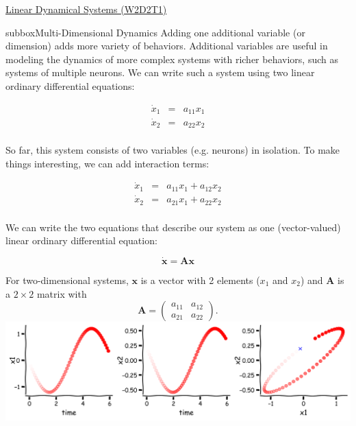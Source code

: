 \begin{textbox}{\href{https://compneuro.neuromatch.io/tutorials/W2D2_LinearSystems/student/W2D2_Tutorial1.html}{Linear Dynamical Systems (W2D2T1)} }
\begin{subbox}{subbox}{Multi-Dimensional Dynamics}
\scriptsize
Adding one additional variable (or dimension) adds more variety of behaviors. Additional variables are useful in modeling the dynamics of more complex systems with richer behaviors, such as systems of multiple neurons. We can write such a system using two linear ordinary differential equations:

\begin{eqnarray}
  \dot{x}_1 &=& {a}_{11} x_1 \\
  \dot{x}_2 &=& {a}_{22} x_2 \\
\end{eqnarray}

So far, this system consists of two variables (e.g. neurons) in isolation. To make things interesting, we can add interaction terms:

\begin{eqnarray}
  \dot{x}_1 &=& {a}_{11} x_1 + {a}_{12} x_2 \\
  \dot{x}_2 &=& {a}_{21} x_1 + {a}_{22} x_2 \\
\end{eqnarray}

We can write the two equations that describe our system as one (vector-valued) linear ordinary differential equation:

$$\dot{\mathbf{x}} = \mathbf{A} \mathbf{x}$$

For two-dimensional systems, $\mathbf{x}$ is a vector with 2 elements ($x_1$ and $x_2$) and $\mathbf{A}$ is a $2 \times 2$ matrix with 
$$\mathbf{A}=
\begin{pmatrix}
 a_{11} & a_{12} \\
 a_{21} & a_{22} 
\end{pmatrix}.
$$
\centering
\includegraphics[scale=0.14]{Figures/LS/LSFigure2.png}

\end{subbox}

\end{textbox}
